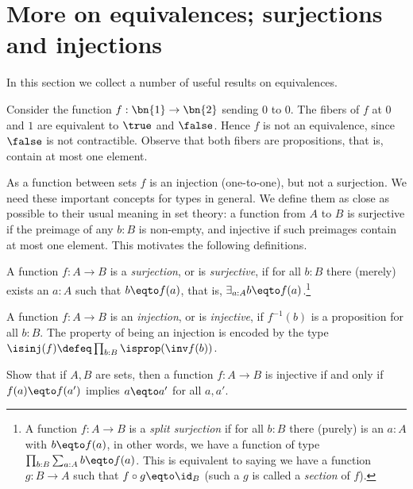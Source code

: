 \section{More on equivalences; surjections and injections}
\label{sec:more-on-equivalences}

In this section we collect a number of useful results on equivalences.

Consider the function $f:\bn{1}\to\bn{2}$ sending $0$ to $0$.
The fibers of $f$ at $0$ and $1$ are equivalent to $\true$ and $\false$.
Hence $f$ is not an equivalence, since $\false$ is not contractible. 
Observe that both fibers are propositions, that is, contain at most one element.

As a function between sets
$f$ is an injection (one-to-one), but not a surjection.
We need these important concepts for types in general.
We define them as close as possible to their
usual meaning in set theory: a function from $A$ to $B$ is
surjective if the preimage of any $b:B$ is non-empty,
and injective if such preimages contain at most one element.
This motivates the following definitions.

\begin{definition}\label{def:surjection}
A function $f:A\to B$ is a \emph{surjection}, or is \emph{surjective},
if for all $b:B$ there (merely) exists an $a:A$ such that $b \eqto f(a)$,
that is, $\exists_{a:A} b \eqto f(a)$.\footnote{%
  A function $f:A\to B$ is a \emph{split surjection}
  if for all $b:B$ there (purely) is an $a:A$ with $b \eqto f(a)$,
  in other words, we have a function of type $\prod_{b:B} \sum_{a:A} b \eqto f(a)$.
  This is equivalent to saying we have a function
  $g:B\to A$ such that $f\circ g \eqto \id_B$
  (such a $g$ is called a \emph{section} of $f$).}
\end{definition}

\begin{definition}\label{def:injection}
  A function $f:A\to B$ is an \emph{injection}, or is \emph{injective},
  if $f^{-1}(b)$ is a proposition for all $b:B$.  The property of being an injection is encoded by
  the type $\isinj(f) \defeq \prod_{b:B} \isprop(\inv f (b))$.
\end{definition}

\begin{xca}\label{xca:inj-sets}
  Show that if $A,B$ are sets, then a function
  $f : A \to B$ is injective if and only if
  $f(a) \eqto f(a')$ implies $a \eqto a'$ for all $a,a'$.
\end{xca}

